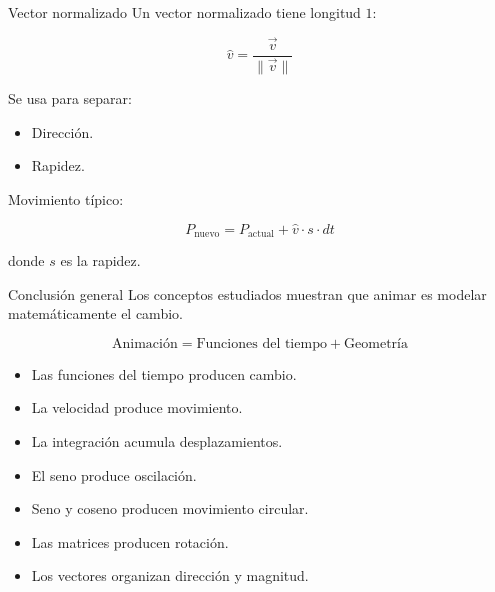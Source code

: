 \documentclass{beamer}
\begin{document}
\begin{frame}{Vector normalizado}
Un vector normalizado tiene longitud \(1\):

\[
\hat{v}=\frac{\vec{v}}{\|\vec{v}\|}
\]

\medskip

Se usa para separar:

\begin{itemize}
    \item Dirección.
    \item Rapidez.
\end{itemize}

\medskip

Movimiento típico:

\[
P_{\text{nuevo}}=P_{\text{actual}}+\hat{v}\cdot s\cdot dt
\]

donde \(s\) es la rapidez.
\end{frame}

\begin{frame}{Conclusión general}
Los conceptos estudiados muestran que animar es modelar matemáticamente el cambio.

\medskip

\[
\text{Animación}=\text{Funciones del tiempo}+\text{Geometría}
\]

\medskip

\begin{itemize}
    \item Las funciones del tiempo producen cambio.
    \item La velocidad produce movimiento.
    \item La integración acumula desplazamientos.
    \item El seno produce oscilación.
    \item Seno y coseno producen movimiento circular.
    \item Las matrices producen rotación.
    \item Los vectores organizan dirección y magnitud.
\end{itemize}
\end{frame}
\end{document}
